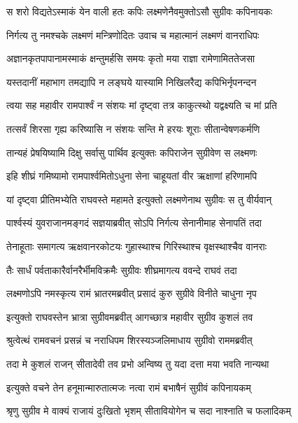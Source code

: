 \twolineshloka
{स शरो विद्यतेऽस्माकं येन वाली हतः कपिः}
{लक्ष्मणेनैवमुक्तोऽसौ सुग्रीवः कपिनायकः} %

\twolineshloka
{निर्गत्य तु नमश्चके लक्ष्मणं मन्त्रिणोदितः}
{उवाच च महात्मानं लक्ष्मणं वानराधिपः} %

\twolineshloka
{अज्ञानकृतपापानामस्माकं क्षन्तुमर्हसि}
{समयः कृतो मया राज्ञा रामेणामिततेजसा} %

\twolineshloka
{यस्तदानीं महाभाग तमद्यापि न लङ्घये}
{यास्यामि निखिलरैद्य कपिभिर्नृपनन्दन} %

\twolineshloka
{त्वया सह महावीर रामपार्श्वं न संशयः}
{मां दृष्ट्वा तत्र काकुत्स्थो यद्वक्ष्यति च मां प्रति} %

\twolineshloka
{तत्सर्वं शिरसा गृह्य करिष्यासि न संशयः}
{सन्ति मे हरयः शूराः सीतान्वेषणकर्मणि} %

\twolineshloka
{तान्यहं प्रेषयिष्यामि दिक्षु सर्वासु पार्थिव}
{इत्युक्तः कपिराजेन सुग्रीवेण स लक्ष्मणः} %

\twolineshloka
{इहि शीघ्रं गमिष्यामो रामपार्श्वमितोऽधुना}
{सेना चाहूयतां वीर ऋक्षाणां हरिणामपि} %

\twolineshloka
{यां दृष्ट्वा प्रीतिमभ्येति राघवस्ते महामते}
{इत्युक्तो लक्ष्मणेनाथ सुग्रीवः स तु वीर्यवान्} %

\twolineshloka
{पार्श्वस्यं युवराजानमङ्गदं सज्ञयाब्रवीत्}
{सोऽपि निर्गत्य सेनानीमाह सेनापतिं तदा} %

\twolineshloka
{तेनाहूताः समागत्य ऋक्षवानरकोटयः}
{गुहास्थाश्च गिरिस्थाश्च वृक्षस्थाश्चैव वानराः} %

\twolineshloka
{तैः सार्धं पर्वताकारैर्वानरैर्भीमविक्रमैः}
{सुग्रीवः शीघ्रमागत्य ववन्दे राघवं तदा} %

\twolineshloka
{लक्ष्मणोऽपि नमस्कृत्य रामं भ्रातरमब्रवीत्}
{प्रसादं कुरु सुग्रीवे विनीते चाधुना नृप} %

\twolineshloka
{इत्युक्तो राघवस्तेन भ्रात्रा सुग्रीवमब्रवीत्}
{आगच्छात्र महावीर सुग्रीव कुशलं तव} %

\twolineshloka
{श्रुत्वेत्थं रामवचनं प्रसन्नं च नराधिपम}
{शिरस्यञ्जलिमाधाय सुग्रीवो राममब्रवीत्} %

\twolineshloka
{तदा मे कुशलं राजन् सीतादेवी तव प्रभो}
{अन्विष्य तु यदा दत्ता मया भवति नान्यथा} %

\twolineshloka
{इत्युक्ते वचने तेन हनूमान्मारुतात्मजः}
{नत्वा रामं बभाषैनं सुग्रीवं कपिनायकम्} %

\twolineshloka
{श्रृणु सुग्रीव मे वाक्यं राजायं दुःखितो भृशम्}
{सीतावियोगेन च सदा नाश्नाति च फलादिकम्} %

